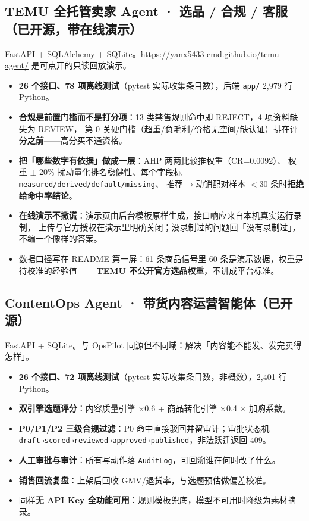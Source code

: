 \documentclass[10.5pt,a4paper]{article}
\begin{document}
\subsection{TEMU 全托管卖家 Agent · 选品 / 合规 / 客服（已开源，带在线演示）}
FastAPI + SQLAlchemy + SQLite。\url{https://yanx5433-cmd.github.io/temu-agent/} 是可点开的只读回放演示。
\begin{itemize}
\item \textbf{26 个接口、78 项离线测试}（pytest 实际收集条目数），后端 \texttt{app/} 2{,}979 行 Python。
\item \textbf{合规是前置门槛而不是打分项}：13 类禁售规则命中即 REJECT，4 项资料缺失为 REVIEW，
  第 0 关硬门槛（超重/负毛利/价格无空间/缺认证）排在评分\textbf{之前}——高分买不通资格。
\item \textbf{把「哪些数字有依据」做成一层}：AHP 两两比较推权重（CR=0.0092）、
  权重 $\pm$ 20\% 扰动量化排名稳健性、每个字段标 \texttt{measured/derived/default/missing}、
  推荐$\to$动销配对样本 $<30$ 条时\textbf{拒绝给命中率结论}。
\item \textbf{在线演示不撒谎}：演示页由后台模板原样生成，接口响应来自本机真实运行录制，
  上传与官方授权在演示里明确关闭；没录制过的问题回「没有录制过」，不编一个像样的答案。
\item 数据口径写在 README 第一屏：61 条商品信号里 60 条是演示数据，权重是待校准的经验值——
  \textbf{TEMU 不公开官方选品权重}，不讲成平台标准。
\end{itemize}

\subsection{ContentOps Agent · 带货内容运营智能体（已开源）}
FastAPI + SQLite。与 OpsPilot 同源但不同域：解决「内容能不能发、发完卖得怎样」。
\begin{itemize}
\item \textbf{26 个接口、72 项离线测试}（pytest 实际收集条目数，非概数），2{,}401 行 Python。
\item \textbf{双引擎选题评分}：内容质量引擎 ×0.6 + 商品转化引擎 ×0.4 × 加购系数。
\item \textbf{P0/P1/P2 三级合规过滤}：P0 命中直接驳回并留审计；审批状态机
  \texttt{draft→\allowbreak scored→\allowbreak reviewed→\allowbreak approved→\allowbreak published}，非法跃迁返回 409。
\item \textbf{人工审批与审计}：所有写动作落 \texttt{AuditLog}，可回溯谁在何时改了什么。
\item \textbf{销售回流复盘}：上架后回收 GMV/退货率，与选题预估做偏差校准。
\item 同样\textbf{无 API Key 全功能可用}：规则模板兜底，模型不可用时降级为素材摘录。
\end{itemize}
\end{document}
